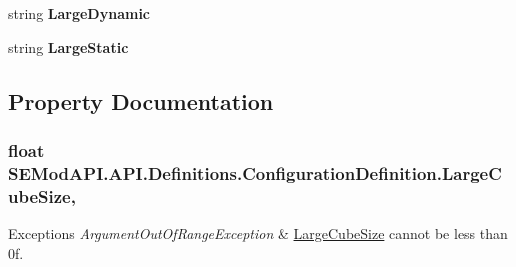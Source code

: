 \begin{DoxyCompactItemize}
\item 
\hypertarget{class_s_e_mod_a_p_i_1_1_a_p_i_1_1_definitions_1_1_configuration_definition_af3f645ae9476d32ab62ccc5de6ce58aa}{}string {\bfseries Large\+Dynamic}\label{class_s_e_mod_a_p_i_1_1_a_p_i_1_1_definitions_1_1_configuration_definition_af3f645ae9476d32ab62ccc5de6ce58aa}

\item 
\hypertarget{class_s_e_mod_a_p_i_1_1_a_p_i_1_1_definitions_1_1_configuration_definition_ac033efc646fce25024ba1ac423c3166c}{}string {\bfseries Large\+Static}\label{class_s_e_mod_a_p_i_1_1_a_p_i_1_1_definitions_1_1_configuration_definition_ac033efc646fce25024ba1ac423c3166c}

\end{DoxyCompactItemize}


\subsection{Property Documentation}
\hypertarget{class_s_e_mod_a_p_i_1_1_a_p_i_1_1_definitions_1_1_configuration_definition_ab9cdee5652ef56b1ce4592ad8c447992}{}
\subsubsection[{Large\+Cube\+Size}]{\setlength{\rightskip}{0pt plus 5cm}float S\+E\+Mod\+A\+P\+I.\+A\+P\+I.\+Definitions.\+Configuration\+Definition.\+Large\+Cube\+Size\hspace{0.3cm}{\ttfamily [get]}, {\ttfamily [set]}}\label{class_s_e_mod_a_p_i_1_1_a_p_i_1_1_definitions_1_1_configuration_definition_ab9cdee5652ef56b1ce4592ad8c447992}

\begin{DoxyExceptions}{Exceptions}
{\em Argument\+Out\+Of\+Range\+Exception} & \hyperlink{class_s_e_mod_a_p_i_1_1_a_p_i_1_1_definitions_1_1_configuration_definition_ab9cdee5652ef56b1ce4592ad8c447992}{Large\+Cube\+Size} cannot be less than 0f. \\
\hline
\end{DoxyExceptions}
\hypertarget{class_s_e_mod_a_p_i_1_1_a_p_i_1_1_definitions_1_1_configuration_definition_aceadd5f38a6297da375f29a3b35865e6}{}
